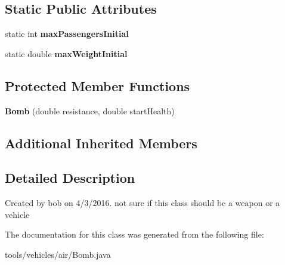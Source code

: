 \subsection*{Static Public Attributes}
\begin{DoxyCompactItemize}
\item 
static int {\bfseries max\+Passengers\+Initial}\hypertarget{classtools_1_1vehicles_1_1air_1_1_bomb_a692b428b312cfaec77de1c34ea66eb48}{}\label{classtools_1_1vehicles_1_1air_1_1_bomb_a692b428b312cfaec77de1c34ea66eb48}

\item 
static double {\bfseries max\+Weight\+Initial}\hypertarget{classtools_1_1vehicles_1_1air_1_1_bomb_adb8924399e78068c49141433c57e36a2}{}\label{classtools_1_1vehicles_1_1air_1_1_bomb_adb8924399e78068c49141433c57e36a2}

\end{DoxyCompactItemize}
\subsection*{Protected Member Functions}
\begin{DoxyCompactItemize}
\item 
{\bfseries Bomb} (double resistance, double start\+Health)\hypertarget{classtools_1_1vehicles_1_1air_1_1_bomb_aa4d622bdba7ae47a3ff0e75ba26e7e2a}{}\label{classtools_1_1vehicles_1_1air_1_1_bomb_aa4d622bdba7ae47a3ff0e75ba26e7e2a}

\end{DoxyCompactItemize}
\subsection*{Additional Inherited Members}


\subsection{Detailed Description}
Created by bob on 4/3/2016. not sure if this class should be a weapon or a vehicle 

The documentation for this class was generated from the following file\+:\begin{DoxyCompactItemize}
\item 
tools/vehicles/air/Bomb.\+java\end{DoxyCompactItemize}
